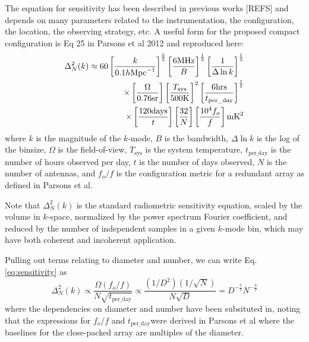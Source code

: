 \documentclass[ars]{copernicus}
\begin{document}
The equation for sensitivity has been described in previous works [REFS] and depends on many parameters
related to the instrumentation, the configuration, the location, the observing strategy, etc.  A useful form for 
the proposed compact configuration is Eq 25 in Parsons et al 2012 and reproduced here:
\begin{equation}
\centering
\label{eq:sensitivity}
\begin{split}
\Delta^2_N(k) \approx 60 \left[\frac{k}{0.1h\text{Mpc}^{-1}}\right]^\frac{5}{2}
                                         \left[\frac{6 \text{MHz}}{B}\right]^\frac{1}{2}
                                         \left[\frac{1}{\Delta\ln k}\right]^\frac{1}{2} \\
                        \times       \left[\frac{\Omega}{0.76\text{sr}}\right]
                                         \left[\frac{T_\text{sys}}{500 \text{K}}\right]^2
                                         \left[\frac{6 \text{hrs}}{t_\text{per\_day}}\right]^\frac{1}{2} \\
                        \times       \left[\frac{120\text{days}}{t}\right]
                                         \left[\frac{32}{N}\right]
                                         \left[\frac{\text{10}^4f_o}{f}\right]  \text{mK}^2
\end{split}
\end{equation}
where $k$ is the magnitude of the $k$-mode, $B$ is the bandwidth, $\Delta\ln k$ is the log
of the binsize, $\Omega$ is the field-of-view, $T_{\text{sys}}$ is the system temperature, 
${t_\text{per\_day}}$ is the number of hours observed per day, $t$ is the number of days
observed, $N$ is the number of antennas, and $f_o/f$ is the configuration metric for a 
redundant array as defined in Parsons et al.

Note that $\Delta^2_N(k)$ is the standard radiometric sensitivity equation, scaled by
the volume in $k$-space, normalized by the power spectrum Fourier coefficient, and
reduced by the number of independent samples in a given $k$-mode bin, which may have
both coherent and incoherent application.

Pulling out terms relating to diameter and number, we can write Eq. \ref{eq:sensitivity} as
\begin{equation}
\label{eq:reducedSensitivity}
\Delta^2_N(k) \propto \frac{\Omega (f_o/f)}{N\sqrt{t_\text{per\_day}}} \propto \frac{(1/D^2)(1/\sqrt{N})}{N\sqrt{D}}
= D^{-\frac{5}{2}}N^{-\frac{3}{2}}
\end{equation}
where the dependencies on diameter and number have been subsituted in, noting that the expressions for $f_o/f$ and 
$t_\text{per\_day}$were derived in Parsons et al where the baselines for the close-packed array are multiples of the diameter.
\end{document}
